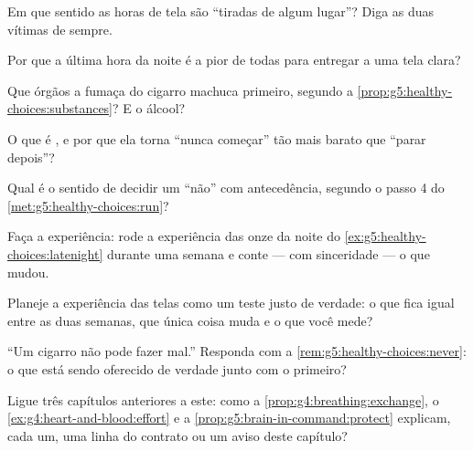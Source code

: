 \begin{exercise}[$\star$]\label{exo:g5:healthy-choices:3}
Em que sentido as horas de tela são ``tiradas de algum lugar''? Diga
as duas vítimas de sempre.
\end{exercise}

\begin{exercise}[$\star$]\label{exo:g5:healthy-choices:4}
Por que a última hora da noite é a pior de todas para entregar a uma
tela clara?
\end{exercise}

\begin{exercise}[$\star$]\label{exo:g5:healthy-choices:5}
Que órgãos a fumaça do cigarro machuca primeiro, segundo a
\cref{prop:g5:healthy-choices:substances}? E o álcool?
\end{exercise}

\begin{exercise}[$\star$]\label{exo:g5:healthy-choices:6}
O que é , e por que ela torna ``nunca começar'' tão mais
barato que ``parar depois''?
\end{exercise}

\begin{exercise}[$\star$]\label{exo:g5:healthy-choices:7}
Qual é o sentido de decidir um ``não'' com antecedência, segundo o
passo 4 do \cref{met:g5:healthy-choices:run}?
\end{exercise}

\begin{exercise}[$\star$]\label{exo:g5:healthy-choices:8}
Faça a experiência: rode a experiência das onze da noite do
\cref{ex:g5:healthy-choices:latenight} durante uma semana e conte ---
com sinceridade --- o que mudou.
\end{exercise}

\begin{exercise}[$\star\star$]\label{exo:g5:healthy-choices:9}
Planeje a experiência das telas como um teste justo de verdade: o
que fica igual entre as duas semanas, que única coisa muda e o que
você mede?
\end{exercise}

\begin{exercise}[$\star\star$]\label{exo:g5:healthy-choices:10}
``Um cigarro não pode fazer mal.'' Responda com a
\cref{rem:g5:healthy-choices:never}: o que está sendo oferecido de
verdade junto com o primeiro?
\end{exercise}

\begin{exercise}[$\star\star\star$]\label{exo:g5:healthy-choices:11}
Ligue três capítulos anteriores a este: como a
\cref{prop:g4:breathing:exchange}, o
\cref{ex:g4:heart-and-blood:effort} e a
\cref{prop:g5:brain-in-command:protect} explicam, cada um, uma linha
do contrato ou um aviso deste capítulo?
\end{exercise}
